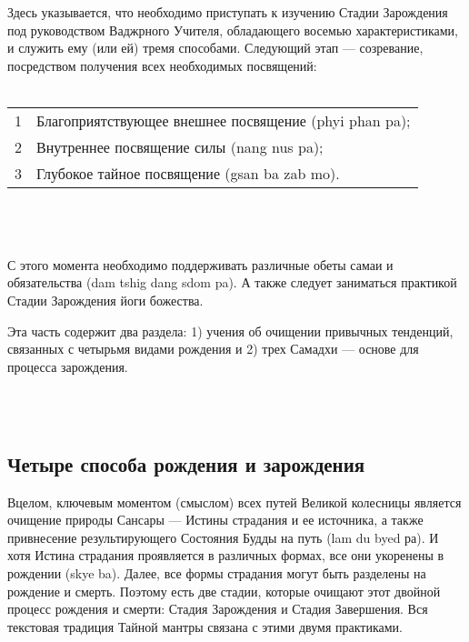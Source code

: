 Здесь указывается, что необходимо приступать к изучению Стадии Зарождения под
руководством Ваджрного Учителя, обладающего восемью характеристиками, и служить ему
(или ей) тремя способами. Следующий этап — созревание, посред\-ством получения всех
необходимых посвящений:\\
\\
\begin{tabular}{ll}
1 & Благоприятствующее внешнее посвящение (phyi phan pa);\\
2 & Внутреннее посвящение силы (nang nus pa);\\
3 & Глубокое тайное посвящение (gsan ba zab mo).\\
\end{tabular}
\\
\\
\\
С этого момента необходимо поддерживать различные обеты самаи и обязательства
(dam tshig dang sdom pa). А также следует заниматься практикой Стадии Зарождения йоги
божества.\\

\begin{siderules}
Эта часть содержит два раздела: 1) учения об очищении привычных тенденций, связанных с четырьмя видами рождения и
2) трех Самадхи — основе для процесса зарождения.
\end{siderules}
\\
\\
\newpage

\subsection{Четыре способа рождения и зарождения}
\vspace{1cm}
\begin{siderules}
Вцелом, ключевым моментом (смыслом) всех путей Великой колесницы является очищение
природы Сансары — Истины страдания и ее источника, а также привнесение
результи\-рующего Состояния Будды на путь (lam du byed ра). И хотя Истина страдания
проявляется в различных формах, все они укоренены в рождении (skye ba).
Далее, все формы страдания могут быть разделены на рождение и смерть.
Поэтому есть две стадии, которые очищают этот двойной процесс рождения и смерти:
Стадия Зарождения и Стадия Завершения. Вся текстовая традиция Тайной мантры
связана с этими двумя практиками.
\end{siderules}

